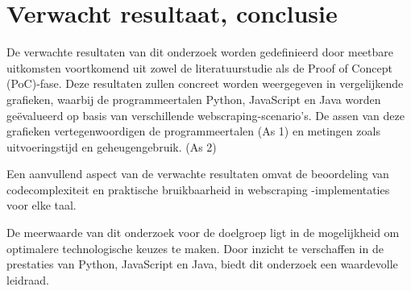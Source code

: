 \section{Verwacht resultaat, conclusie}%
\label{sec:verwachte_resultaten}
De verwachte resultaten van dit onderzoek worden gedefinieerd door meetbare uitkomsten voortkomend uit zowel de literatuurstudie 
als de Proof of Concept (PoC)-fase. Deze resultaten zullen concreet worden weergegeven in vergelijkende grafieken, waarbij de 
programmeertalen Python, JavaScript en Java worden geëvalueerd op basis van verschillende webscraping-scenario's. 
De assen van deze grafieken vertegenwoordigen de programmeertalen (As 1) en metingen zoals uitvoeringstijd en geheugengebruik. (As 2)
  
Een aanvullend aspect van de verwachte resultaten omvat de beoordeling van codecomplexiteit en praktische bruikbaarheid in webscraping
-implementaties voor elke taal.

De meerwaarde van dit onderzoek voor de doelgroep ligt in de mogelijkheid om optimalere technologische keuzes te maken. 
Door inzicht te verschaffen in de prestaties van Python, JavaScript en Java, biedt dit onderzoek een waardevolle leidraad. 